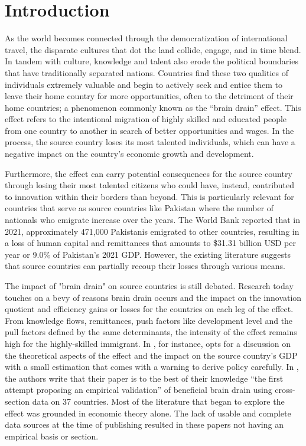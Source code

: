 \documentclass[12pt]{article}
\begin{document}
\section{Introduction}
As the world becomes connected through the democratization of international travel, the disparate cultures that dot the land collide, engage, and in time blend.
In tandem with culture, knowledge and talent also erode the political boundaries that have traditionally separated nations.
Countries find these two qualities of individuals extremely valuable and begin to actively seek and entice them to leave their home country for more opportunities, often to the detriment of their home countries; a phenomenon commonly known as the “brain drain” effect.
This effect refers to the intentional migration of highly skilled and educated people from one country to another in search of better opportunities and wages.
In the process, the source country loses its most talented individuals, which can have a negative impact on the country's economic growth and development.

Furthermore, the effect can carry potential consequences for the source country through losing their most talented citizens who could have, instead, contributed to innovation within their borders than beyond.
This is particularly relevant for countries that serve as source countries like Pakistan where the number of nationals who emigrate increase over the years.
The World Bank reported that in 2021, approximately 471,000 Pakistanis emigrated to other countries, resulting in a loss of human capital and remittances that amounts to \$31.31 billion USD per year or 9.0\% of Pakistan's 2021 GDP.
However, the existing literature suggests that source countries can partially recoup their losses through various means.

The impact of "brain drain" on source countries is still debated.
Research today touches on a bevy of reasons brain drain occurs and the impact on the innovation quotient and efficiency gains or losses for the countries on each leg of the effect.
From knowledge flows, remittances, push factors like development level and the pull factors defined by the same determinants, the intensity of the effect remains high for the highly-skilled immigrant.
In \cite{hall_brain_2005}, for instance, opts for a discussion on the theoretical aspects of the effect and the impact on the source country's GDP with a small estimation that comes with a warning to derive policy carefully.
In \citeauthor{beine_brain_2001}, the authors write that their paper is to the best of their knowledge ``the first attempt proposing an empirical validation'' of beneficial brain drain using cross-section data on 37 countries.
Most of the literature that began to explore the effect was grounded in economic theory alone.
The lack of usable and complete data sources at the time of publishing resulted in these papers not having an empirical basis or section.
\end{document}
